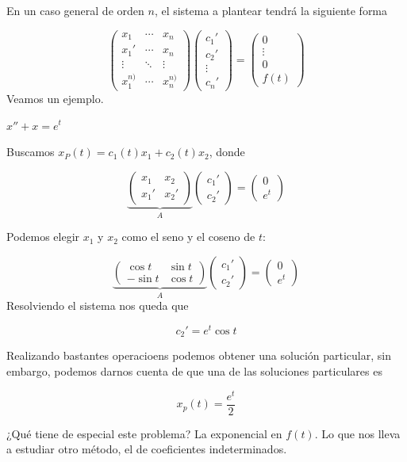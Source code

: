 \documentclass{mathnotes}
\begin{document}
En un caso general de orden $n$, el sistema a plantear tendrá la siguiente forma

\[ \begin{pmatrix}
x_1 & \cdots & x_n \\
x_1' & \cdots & x_n \\
\vdots & \ddots & \vdots \\
x_1^{n)} & \cdots & x_n^{n)}
\end{pmatrix} \begin{pmatrix} c_1' \\ c_2' \\ \vdots \\ c_n' \end{pmatrix} 
= 
\begin{pmatrix}
0 \\ \vdots \\ 0 \\ f(t)
\end{pmatrix} \]
Veamos un ejemplo.

\begin{example}
$x'' + x = e^t$

Buscamos $x_P(t) = c_1(t) x_1 + c_2(t) x_2$, donde

\[ \underbrace{\begin{pmatrix}
x_1 & x_2 \\
x_1' & x_2' 
\end{pmatrix}}_A\begin{pmatrix}
c_1' \\ c_2'
\end{pmatrix} = \begin{pmatrix}
0 \\ e^t
\end{pmatrix} \] 

Podemos elegir $x_1$ y $x_2$ como el seno y el coseno de $t$:

\[ \underbrace{\begin{pmatrix}
\cos t & \sin t \\
- \sin t & \cos t 
\end{pmatrix}}_A\begin{pmatrix}
c_1' \\ c_2'
\end{pmatrix} = \begin{pmatrix}
0 \\ e^t
\end{pmatrix} \] 
Resolviendo el sistema nos queda que 

\[ c_2' = e^t \cos t \]

Realizando bastantes operacioens podemos obtener una solución particular, sin embargo, podemos darnos cuenta de que una de las soluciones particulares es

\[ x_p(t) = \frac{e^t}{2} \]

¿Qué tiene de especial este problema? La exponencial en $f(t)$. Lo que nos lleva a estudiar otro método, el de coeficientes indeterminados.
\end{example}
\end{document}
